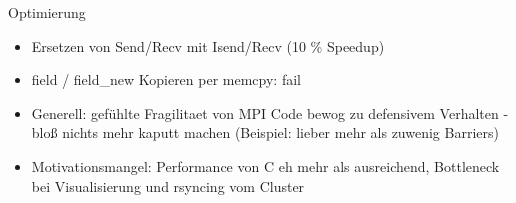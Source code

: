 \begin{frame}{Optimierung}
	\begin{itemize}
		\item Ersetzen von Send/Recv mit Isend/Recv (10 \% Speedup)
		\item field / field\_new Kopieren per memcpy: fail
    \item Generell: gefühlte Fragilitaet von MPI Code bewog zu defensivem Verhalten - bloß nichts mehr kaputt machen (Beispiel: lieber mehr als zuwenig Barriers)
    \item Motivationsmangel: Performance von C eh mehr als ausreichend, Bottleneck bei
      Visualisierung und rsyncing vom Cluster
	\end{itemize}
\end{frame}

